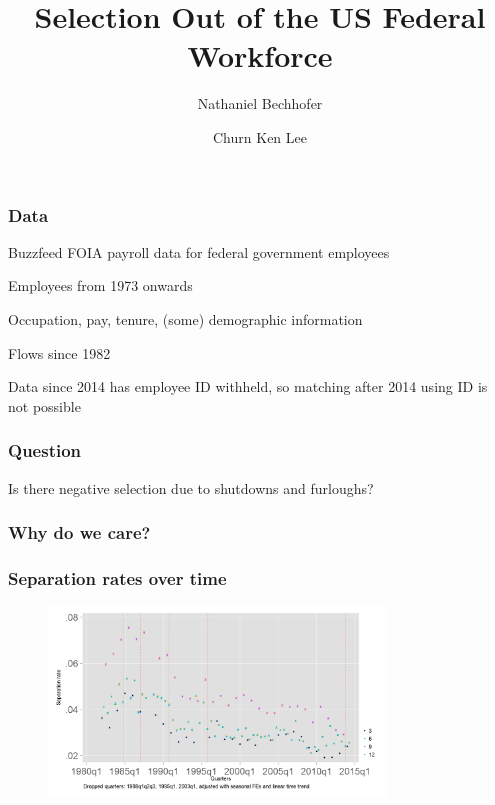 \documentclass[aspectratio=169]{beamer}
\title{Selection Out of the US Federal Workforce}
\author{Nathaniel Bechhofer \and Churn Ken Lee}
\institute{UC San Diego}
\date{}
\newenvironment{wideitemize}{\itemize\addtolength{\itemsep}{10pt}}{\enditemize}
\begin{document}
\begin{frame}
    \titlepage
\end{frame}

\begin{frame}
    \frametitle{Data}

    \begin{wideitemize}
        \item Buzzfeed FOIA payroll data for federal government employees
        \item Employees from 1973 onwards
        \item Occupation, pay, tenure, (some) demographic information
        \item Flows since 1982
        \item Data since 2014 has employee ID withheld, so matching after 2014 using ID is not possible
    \end{wideitemize}

\end{frame}

\begin{frame}
    \frametitle{Question}

    Is there negative selection due to shutdowns and furloughs?

\end{frame}

\begin{frame}
    \frametitle{Why do we care?}

    \begin{wideitemize}
        \item 
    \end{wideitemize}

\end{frame}

\begin{frame}
    \frametitle{Separation rates over time}

    \begin{figure}[]
        \centering
        \includegraphics[width=0.8\textwidth]{../output/separation_rate_CI.png}
    \end{figure}

\end{frame}
\end{document}
